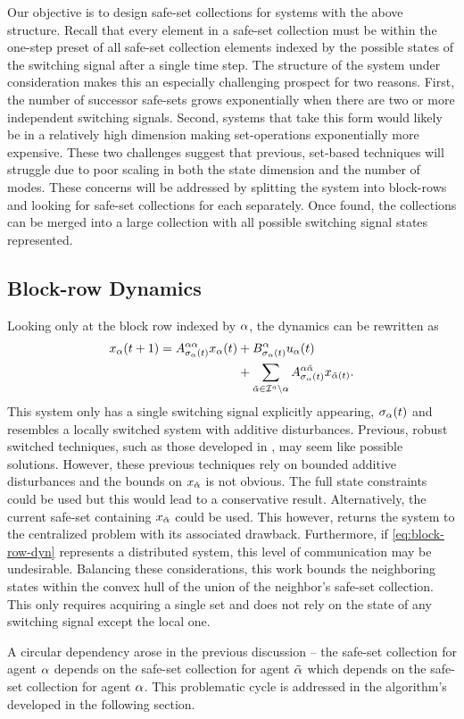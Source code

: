 Our objective is to design safe-set collections for systems with the above structure. Recall that every element in a safe-set collection must be within the one-step preset of all safe-set collection elements indexed by the possible states of the switching signal after a single time step. The structure of the system under consideration makes this an especially challenging prospect for two reasons. First, the number of successor safe-sets grows exponentially when there are two or more independent switching signals. Second, systems that take this form would likely be in a relatively high dimension making set-operations exponentially more expensive. These two challenges suggest that previous, set-based techniques will struggle due to poor scaling in both the state dimension and the number of modes. These concerns will be addressed by splitting the system into block-rows and looking for safe-set collections for each separately. Once found, the collections can be merged into a large collection with all possible switching signal states represented.

\subsection{Block-row Dynamics}
Looking only at the block row indexed by $\alpha$, the dynamics can be rewritten as 
\begin{align}\label{eq:block-row-dyn}
x_\agentidx(t+1)=A^{\agentidx\agentidx}_{\ss_\agentidx(t)}x_\agentidx(t)&+B^\agentidx_{\ss_\agentidx(t)}u_\agentidx(t)\nonumber\\&+\sum_{\tilde\agentidx\in\agentidxset\setminus \agentidx}A^{\agentidx\tilde\agentidx}_{\ss_\agentidx(t)}x_{\tilde\agentidx(t)}.
\end{align}
This system only has a single switching signal explicitly appearing, ${\sigma}_{\alpha}(t)$ and resembles a locally switched system with additive disturbances. Previous, robust switched techniques, such as those developed in \cite{Lavaei2021}, may seem like possible solutions. However, these previous techniques rely on bounded additive disturbances and the bounds on $x_{\tilde{\alpha}}$ is not obvious. The full state constraints could be used but this would lead to a conservative result. Alternatively, the current safe-set containing $x_{\tilde{\alpha}}$ could be used. This however, returns the system to the centralized problem with its associated drawback. Furthermore, if \autoref{eq:block-row-dyn} represents a distributed system, this level of communication may be undesirable. Balancing these considerations, this work bounds the neighboring states within the convex hull of the union of the neighbor's safe-set collection. This only requires acquiring a single set and does not rely on the state of any switching signal except the local one. 

A circular dependency arose in the previous discussion -- the safe-set collection for agent $\alpha$ depends on the safe-set collection for agent ${\tilde{\alpha}}$ which depends on the safe-set collection for agent $\alpha$. This problematic cycle is addressed in the algorithm's developed in the following section. 